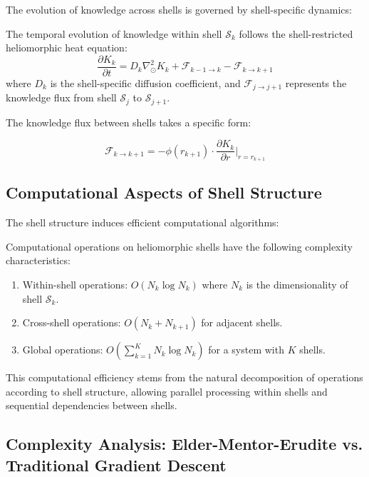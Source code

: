 The evolution of knowledge across shells is governed by shell-specific dynamics:

\begin{proposition}
The temporal evolution of knowledge within shell $\mathcal{S}_k$ follows the shell-restricted heliomorphic heat equation:
\begin{equation}
\frac{\partial K_k}{\partial t} = D_k \nabla_{\odot}^2 K_k + \mathcal{F}_{k-1 \to k} - \mathcal{F}_{k \to k+1}
\end{equation}
where $D_k$ is the shell-specific diffusion coefficient, and $\mathcal{F}_{j \to j+1}$ represents the knowledge flux from shell $\mathcal{S}_j$ to $\mathcal{S}_{j+1}$.
\end{proposition}

The knowledge flux between shells takes a specific form:

\begin{equation}
\mathcal{F}_{k \to k+1} = -\phi(r_{k+1}) \cdot \frac{\partial K_k}{\partial r}\bigg|_{r=r_{k+1}}
\end{equation}

\subsection{Computational Aspects of Shell Structure}

The shell structure induces efficient computational algorithms:

\begin{theorem}
Computational operations on heliomorphic shells have the following complexity characteristics:
\begin{enumerate}
    \item Within-shell operations: $O(N_k \log N_k)$ where $N_k$ is the dimensionality of shell $\mathcal{S}_k$.
    \item Cross-shell operations: $O(N_k + N_{k+1})$ for adjacent shells.
    \item Global operations: $O(\sum_{k=1}^{K} N_k \log N_k)$ for a system with $K$ shells.
\end{enumerate}
\end{theorem}

This computational efficiency stems from the natural decomposition of operations according to shell structure, allowing parallel processing within shells and sequential dependencies between shells.

\subsection{Complexity Analysis: Elder-Mentor-Erudite vs. Traditional Gradient Descent}

